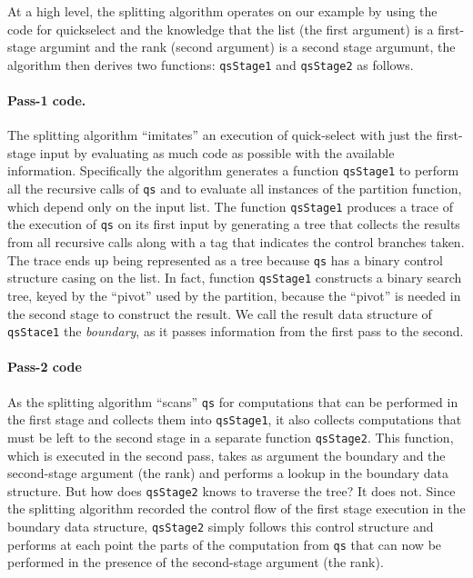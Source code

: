 \begin{abstrsyn}
At a high level, the splitting algorithm operates on our example by
using the code for quickselect and the knowledge that the list (the
first argument) is a first-stage argumint and the rank (second
argument) is a second stage argumunt, the algorithm then derives two
functions: \texttt{qsStage1} and \texttt{qsStage2} as follows. 



\paragraph{Pass-1 code.}
The splitting algorithm ``imitates'' an execution of quick-select with
just the first-stage input by evaluating as much code as possible with
the available information.  Specifically the algorithm generates a
function \texttt{qsStage1} to perform all the recursive calls of
\texttt{qs} and to evaluate all instances of the partition function,
which depend only on the input list.  The function \texttt{qsStage1}
produces a trace of the execution of \texttt{qs} on its first input by
generating a tree that collects the results from all recursive calls
along with a tag that indicates the control branches taken.  The trace
ends up being represented as a tree because \texttt{qs} has a binary
control structure casing on the list. In fact, function
\texttt{qsStage1} constructs a binary search tree, keyed by the
``pivot'' used by the partition, because the ``pivot'' is needed in
the second stage to construct the result.  We call the result data
structure of \texttt{qsStace1} the {\em boundary}, as it passes
information from the first pass to the second.

\paragraph{Pass-2 code}
As the splitting algorithm ``scans'' \texttt{qs} for computations that
can be performed in the first stage and collects them into
\texttt{qsStage1}, it also collects computations that must be left to
the second stage in a separate function \texttt{qsStage2}.  This
function, which is executed in the second pass, takes as argument the
boundary and the second-stage argument (the rank) and performs a
lookup in the boundary data structure.  But how does \texttt{qsStage2}
knows to traverse the tree? It does not. Since the splitting algorithm
recorded the control flow of the first stage execution in the boundary
data structure, \texttt{qsStage2} simply follows this control
structure and performs at each point the parts of the computation from
\texttt{qs} that can now be performed in the presence of the
second-stage argument (the rank).




\end{abstrsyn}
